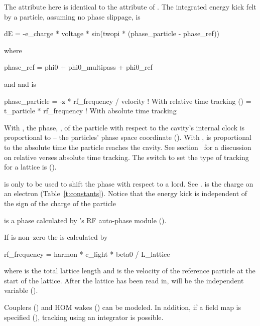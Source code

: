 {The  attribute here is identical to the  attribute of
\mad. The integrated energy kick felt by a particle, assuming no phase slippage, is 
\begin{example}
  dE = -e_charge * voltage * sin(twopi * (phase_particle - phase_ref))
\end{example}
where
\begin{example}
  phase_ref = phi0 + phi0_multipass + phi0_ref
\end{example}
and
and  is
\begin{example}
  phase_particle = -z * rf_frequency / velocity  ! With relative time tracking ()
                 =  t_particle * rf_frequency    ! With absolute time tracking
\end{example}
With , the phase, , of
the particle with respect to the cavity's internal clock is
proportional to  -- the particles' phase space coordinate
(). With ,
 is proportional to the absolute time the particle
reaches the cavity. See section~ for a discussion on
relative verses absolute time tracking. The switch to set the type of
tracking for a lattice is 
().

 is only to be used to shift the phase with respect
to a  lord. See .  is the
charge on an electron (Table~\ref{t:constants}). Notice that the
energy kick is independent of the sign of the charge of the particle

 is a phase calculated by \bmad's RF auto-phase module
().

If  is non--zero the  is calculated by
\begin{example}
  rf_frequency = harmon * c_light * beta0 / L_lattice 
\end{example}
where  is the total lattice length and  is the
velocity of the reference particle at the start of the lattice. After
the lattice has been read in,  will be the
independent variable ().

Couplers () and HOM wakes () can
be modeled. In addition, if a field map is specified
(), tracking using an integrator is possible.

}
